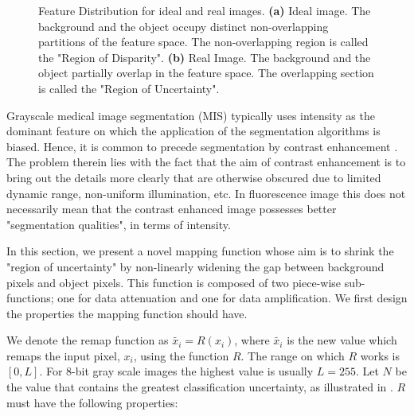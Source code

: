 \begin{figure}[!h]
	\centering
	\caption{Feature Distribution for ideal and real images. \textbf{(a)} Ideal image. The background and the object occupy distinct non-overlapping partitions of the feature space. The non-overlapping region is called the "Region of Disparity". \textbf{(b)} Real Image. The background and the object partially overlap in the feature space. The overlapping section is called the "Region of Uncertainty".}
	\label{fig:featuredataset}
\end{figure}

Grayscale medical image segmentation (MIS) typically uses intensity as the dominant feature on which the application of the segmentation algorithms is biased. Hence, it is common to precede segmentation by contrast enhancement \citep{Kim2003,Subr2005}. The problem therein lies with the fact that the aim of contrast enhancement is to bring out the details more clearly that are otherwise obscured due to limited dynamic range, non-uniform illumination, etc. In fluorescence image this does not necessarily mean that the contrast enhanced image possesses better "segmentation qualities", in terms of intensity.

In this section, we present a novel mapping function whose aim is to shrink the "region of uncertainty" by non-linearly widening the gap between background pixels and object pixels. This function is composed of two piece-wise sub-functions; one for data attenuation and one for data amplification. We first design the properties the mapping function should have. 

\begin{definition}
	We denote the remap function as $\widetilde{x_i} = R(x_i)$, where $\widetilde{x_i}$ is the new value which remaps the input pixel, $x_i$, using the function $R$. The range on which $R$ works is $[0,L]$. For 8-bit gray scale images the highest value is usually $L=255$. 
	Let $N$ be the value that contains the greatest classification uncertainty, as illustrated in .
	$R$ must have the following properties:
\end{definition}

